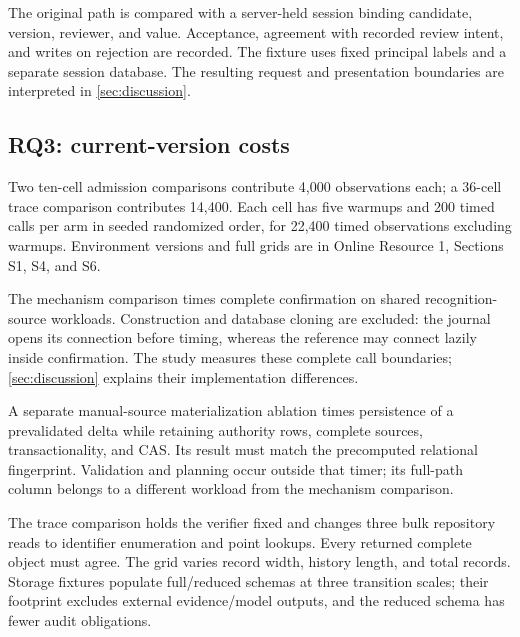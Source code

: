 The original path is compared with a server-held session binding candidate, version, reviewer, and value. Acceptance, agreement with recorded review intent, and writes on rejection are recorded. The fixture uses fixed principal labels and a separate session database. The resulting request and presentation boundaries are interpreted in \cref{sec:discussion}.

\subsection{RQ3: current-version costs}

Two ten-cell admission comparisons contribute 4,000 observations each; a 36-cell trace comparison contributes 14,400. Each cell has five warmups and 200 timed calls per arm in seeded randomized order, for 22,400 timed observations excluding warmups. Environment versions and full grids are in Online Resource 1, Sections S1, S4, and S6.

The mechanism comparison times complete confirmation on shared recognition-source workloads. Construction and database cloning are excluded: the journal opens its connection before timing, whereas the reference may connect lazily inside confirmation. The study measures these complete call boundaries; \cref{sec:discussion} explains their implementation differences.

A separate manual-source materialization ablation times persistence of a prevalidated delta while retaining authority rows, complete sources, transactionality, and CAS. Its result must match the precomputed relational fingerprint. Validation and planning occur outside that timer; its full-path column belongs to a different workload from the mechanism comparison.

The trace comparison holds the verifier fixed and changes three bulk repository reads to identifier enumeration and point lookups. Every returned complete object must agree. The grid varies record width, history length, and total records. Storage fixtures populate full/reduced schemas at three transition scales; their footprint excludes external evidence/model outputs, and the reduced schema has fewer audit obligations.
